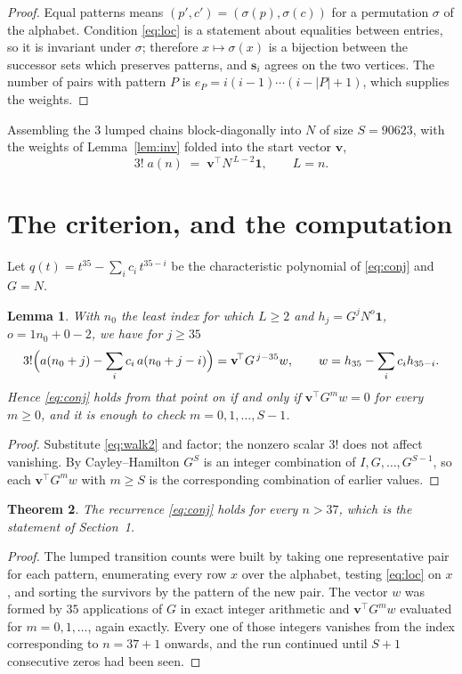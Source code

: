 \documentclass[11pt,a4paper]{article}
\theoremstyle{plain}
\newtheorem{theorem}{Theorem}
\newtheorem{lemma}[theorem]{Lemma}
\theoremstyle{definition}
\begin{document}
\begin{proof}
Equal patterns means $(p',c')=(\sigma(p),\sigma(c))$ for a permutation $\sigma$ of the
alphabet. Condition \eqref{eq:loc} is a statement about equalities between entries, so it is
invariant under $\sigma$; therefore $x\mapsto\sigma(x)$ is a bijection between the successor
sets which preserves patterns, and $\mathbf{s}_i$ agrees on the two vertices. The number of
pairs with pattern $P$ is $e_P=i(i-1)\cdots(i-|P|+1)$, which supplies the weights.
\end{proof}

Assembling the $3$ lumped chains block-diagonally into $N$ of size $S=90623$, with the
weights of Lemma~\ref{lem:inv} folded into the start vector $\mathbf{v}$,
\begin{equation}\label{eq:walk2}
3!\;a(n)\;=\;\mathbf{v}^{\!\top}N^{\,L-2}\mathbf{1},\qquad L=n .
\end{equation}

\section{The criterion, and the computation}

Let $q(t)=t^{35}-\sum_i c_i\,t^{35-i}$ be the characteristic polynomial of
\eqref{eq:conj} and $G=N$.

\begin{lemma}\label{lem:crit}
With $n_0$ the least index for which $L\ge2$ and $h_j=G^{j}N^{o}\mathbf{1}$,
$o=1n_0+0-2$, we have for $j\ge35$
\[
3!\Bigl(a(n_0+j)-\sum_i c_i\,a(n_0+j-i)\Bigr)
=\mathbf{v}^{\!\top}G^{\,j-35}w,\qquad
w=h_{35}-\sum_i c_i h_{35-i} .
\]
Hence \eqref{eq:conj} holds from that point on if and only if
$\mathbf{v}^{\!\top}G^{m}w=0$ for every $m\ge0$, and it is enough to check
$m=0,1,\dots,S-1$.
\end{lemma}

\begin{proof}
Substitute \eqref{eq:walk2} and factor; the nonzero scalar $3!$ does not affect
vanishing. By Cayley--Hamilton $G^{S}$ is an integer combination of $I,G,\dots,G^{S-1}$,
so each $\mathbf{v}^{\!\top}G^{m}w$ with $m\ge S$ is the corresponding combination of
earlier values.
\end{proof}

\begin{theorem}
The recurrence \eqref{eq:conj} holds for every $n>37$, which is the statement of
Section~1.
\end{theorem}

\begin{proof}
The lumped transition counts were built by taking one representative pair for each pattern,
enumerating every row $x$ over the alphabet, testing \eqref{eq:loc} on $x$, and sorting
the survivors by the pattern of the new pair. The vector $w$ was formed by $35$
applications of $G$ in exact integer arithmetic and $\mathbf{v}^{\!\top}G^{m}w$
evaluated for $m=0,1,\dots$, again exactly. Every one of those integers vanishes from the
index corresponding to $n=37+1$ onwards, and the run continued until $S+1$ consecutive
zeros had been seen.
\end{proof}
\end{document}
